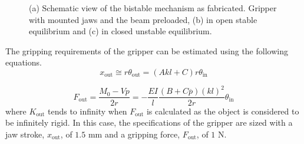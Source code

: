 \begin{figure}[hbt!] %
  \centering
  \caption{(a) Schematic view of the bistable mechanism as fabricated. Gripper with mounted jaws and the beam preloaded, (b) in open stable equilibrium and (c) in closed unstable equilibrium.}
  \label{fig:bistable-mechanism}
\end{figure}
The gripping requirements of the gripper can be estimated using the following equations.
\begin{equation}\label{eq:x_out}
  x_\textrm{out}\cong r{\theta }_\textrm{out}=\left(A kl+C\right)r{\theta }_\textrm{in}
\end{equation}

\begin{equation}\label{eq:f_out}
  F_\textrm{out}=\frac{M_0-Vp}{2r}=-\frac{EI}{l}\frac{{\left(B+C\overline{p}\right)\left(kl\right)}^2}{2r}{\theta }_\textrm{in}
\end{equation}
where $K_\mathrm{out}$ tends to infinity when $F_\mathrm{out}$ is calculated as the object is considered to be infinitely rigid. In this case, the specifications of the gripper are sized with a jaw stroke, $x_\mathrm{out}$, of $1.5$ mm and a gripping force, $F_\mathrm{out}$, of $1$ N.

